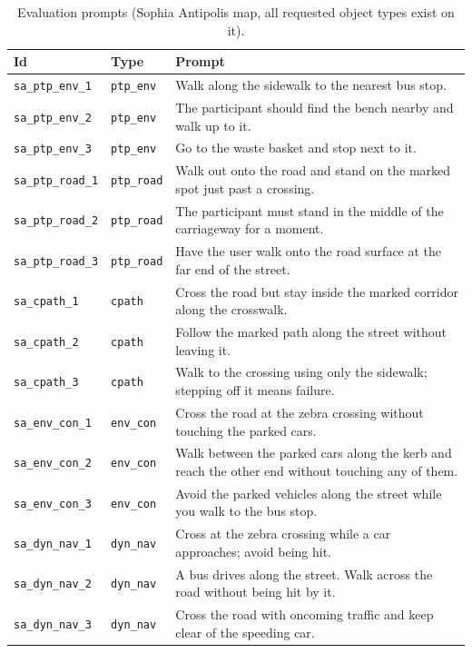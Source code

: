 \begin{longtable}{@{}p{3.5cm}p{2.5cm}p{6.2cm}@{}}
\caption{Evaluation prompts (Sophia Antipolis map, all requested object types exist on it).}\label{tab:prompts}\\
\toprule
Id & Type & Prompt \\
\midrule
\endhead
\texttt{sa\_ptp\_env\_1} & \texttt{ptp\_env} & Walk along the sidewalk to the nearest bus stop. \\
\texttt{sa\_ptp\_env\_2} & \texttt{ptp\_env} & The participant should find the bench nearby and walk up to it. \\
\texttt{sa\_ptp\_env\_3} & \texttt{ptp\_env} & Go to the waste basket and stop next to it. \\
\texttt{sa\_ptp\_road\_1} & \texttt{ptp\_road} & Walk out onto the road and stand on the marked spot just past a crossing. \\
\texttt{sa\_ptp\_road\_2} & \texttt{ptp\_road} & The participant must stand in the middle of the carriageway for a moment. \\
\texttt{sa\_ptp\_road\_3} & \texttt{ptp\_road} & Have the user walk onto the road surface at the far end of the street. \\
\texttt{sa\_cpath\_1} & \texttt{cpath} & Cross the road but stay inside the marked corridor along the crosswalk. \\
\texttt{sa\_cpath\_2} & \texttt{cpath} & Follow the marked path along the street without leaving it. \\
\texttt{sa\_cpath\_3} & \texttt{cpath} & Walk to the crossing using only the sidewalk; stepping off it means failure. \\
\texttt{sa\_env\_con\_1} & \texttt{env\_con} & Cross the road at the zebra crossing without touching the parked cars. \\
\texttt{sa\_env\_con\_2} & \texttt{env\_con} & Walk between the parked cars along the kerb and reach the other end without touching any of them. \\
\texttt{sa\_env\_con\_3} & \texttt{env\_con} & Avoid the parked vehicles along the street while you walk to the bus stop. \\
\texttt{sa\_dyn\_nav\_1} & \texttt{dyn\_nav} & Cross at the zebra crossing while a car approaches; avoid being hit. \\
\texttt{sa\_dyn\_nav\_2} & \texttt{dyn\_nav} & A bus drives along the street. Walk across the road without being hit by it. \\
\texttt{sa\_dyn\_nav\_3} & \texttt{dyn\_nav} & Cross the road with oncoming traffic and keep clear of the speeding car. \\

\end{longtable}
